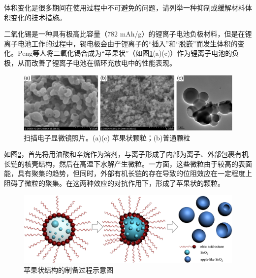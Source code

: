 \documentclass{assignment}
\begin{document}
\begin{ti}
    体积变化是很多期间在使用过程中不可避免的问题，请列举一种抑制或缓解材料体积变化的技术措施。
\end{ti}
\begin{da}
    二氧化锡是一种具有极高比容量（$782$ mAh/g）的锂离子电池负极材料，但是在锂离子电池工作的过程中，锡电极会由于锂离子的“插入”和“脱嵌”而发生体积的变化。Peng\cite{peng2014synthesis}等人将二氧化锡合成为“苹果状”（如图\ref{Apple-like-SnO2}(a)(c)）作为锂离子电池的负极，从而改善了锂离子电池在循环充放电中的性能表现。

    \begin{figure}[H]
        \centering
        \includegraphics[width=.6\columnwidth]{Apple-like-SnO2.jpg}
        \caption{扫描电子显微镜照片。(a)(c) 苹果状颗粒；(b)普通颗粒}
        \label{Apple-like-SnO2}
    \end{figure}

    如图\ref{Apple-like-SnO2-preparation}，首先将用油酸和辛烷作为溶剂，与离子形成了内部为离子、外部包裹有机长链的核壳结构，然后在高温下水解产生微粒。一方面，这些微粒由于较高的表面能，具有聚集的趋势，但同时，外部有机长链的存在导致的位阻效应在一定程度上阻碍了微粒的聚集。在这两种效应的对抗作用下，形成了苹果状的颗粒。
    \begin{figure}[H]
        \centering
        \includegraphics[width=.6\columnwidth]{Apple-like-SnO2-preparation.jpg}
        \caption{苹果状结构的制备过程示意图}
        \label{Apple-like-SnO2-preparation}
    \end{figure}


\end{da}
\end{document}
